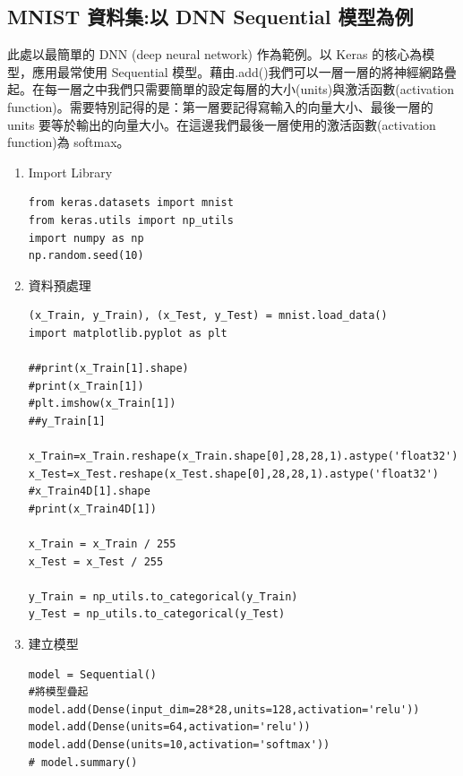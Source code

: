 \documentclass[a4paper,12pt]{article}
\begin{document}
\subsection{MNIST 資料集:以 DNN Sequential 模型為例}
\label{sec:org6aba738}

此處以最簡單的 DNN (deep neural network) 作為範例。以 Keras 的核心為模型，應用最常使用 Sequential 模型。藉由.add()我們可以一層一層的將神經網路疊起。在每一層之中我們只需要簡單的設定每層的大小(units)與激活函數(activation function)。需要特別記得的是：第一層要記得寫輸入的向量大小、最後一層的 units 要等於輸出的向量大小。在這邊我們最後一層使用的激活函數(activation function)為 softmax。\\

\begin{enumerate}
\item Import Library
\label{sec:orgb0ccc13}
\lstset{breaklines=true,language=Python,label= ,caption= ,captionpos=b,numbers=none}
\begin{lstlisting}
from keras.datasets import mnist
from keras.utils import np_utils
import numpy as np
np.random.seed(10)
\end{lstlisting}

\item 資料預處理
\label{sec:orgde9b677}
\lstset{breaklines=true,language=Python,label= ,caption= ,captionpos=b,numbers=none}
\begin{lstlisting}
(x_Train, y_Train), (x_Test, y_Test) = mnist.load_data()
import matplotlib.pyplot as plt

##print(x_Train[1].shape)
#print(x_Train[1])
#plt.imshow(x_Train[1])
##y_Train[1]

x_Train=x_Train.reshape(x_Train.shape[0],28,28,1).astype('float32')
x_Test=x_Test.reshape(x_Test.shape[0],28,28,1).astype('float32')
#x_Train4D[1].shape
#print(x_Train4D[1])

x_Train = x_Train / 255
x_Test = x_Test / 255

y_Train = np_utils.to_categorical(y_Train)
y_Test = np_utils.to_categorical(y_Test)
\end{lstlisting}

\item 建立模型
\label{sec:org4f33506}
\lstset{breaklines=true,language=Python,label= ,caption= ,captionpos=b,numbers=none}
\begin{lstlisting}
model = Sequential()
#將模型疊起
model.add(Dense(input_dim=28*28,units=128,activation='relu'))
model.add(Dense(units=64,activation='relu'))
model.add(Dense(units=10,activation='softmax'))
# model.summary()
\end{lstlisting}


\end{enumerate}
\end{document}
